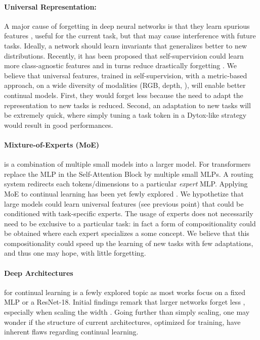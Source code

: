 \paragraph{Universal Representation:} A major cause of forgetting in deep neural networks is that
they learn spurious features \citep{lesort2022spuriousfeatures}, useful for the current task, but
that may cause interference with future tasks. Ideally, a network should learn invariants
\citep{rame2021fishr} that generalizes better to new distributions. Recently, it has been proposed
that self-supervision could learn more class-agnostic features and in turns reduce drastically
forgetting \citep{gallardo2021selfsupcontinual}. We believe that universal features, trained in
self-supervision, with a metric-based approach, on a wide diversity of modalities (RGB, depth,
\etc), will enable better continual models. First, they would forget less because the need to adapt the
representation to new tasks is reduced. Second, an adaptation to new tasks will be extremely quick,
where simply tuning a task token in a Dytox-like strategy would result in good performances.

\paragraph{Mixture-of-Experts (MoE)} is a combination of multiple small models into a larger model. For
transformers replace the MLP in the Self-Attention Block by multiple small MLPs. A routing system
redirects each tokens/dimensions to a particular \textit{expert} MLP. Applying MoE to continual
learning has been yet fewly explored \citep{caccia2022anytimelearning}. We hypothetize that large
models could learn universal features (see previous point) that could be conditioned with
task-specific experts. The usage of experts does not necessarily need to be exclusive to a
particular task: in fact a form of compositionality could be obtained where each expert specializes
a some concept. We believe that this compositionality could speed up the learning of new tasks with
few adaptations, and thus one may hope, with little forgetting.

\paragraph{Deep Architectures} for continual learning is a fewly explored topic as most works focus
on a fixed MLP or a ResNet-18. Initial findings remark that larger networks forget less
\citep{ramasesh2022scalecontinual}, especially when scaling the width
\citep{mirzadeh2022widecontinualnetworks}. Going further than simply scaling, one may wonder if the
structure of current architectures, optimized for \iid training, have inherent flaws regarding
continual learning.

